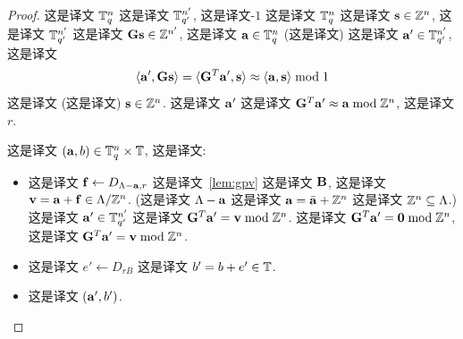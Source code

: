 \begin{proof}
  这是译文 $\mathbb{T}_{q}^{n}$ 这是译文  $\mathbb{T}_{q'}^{n'}$, 这是译文-$1$ 这是译文 $\mathbb{T}_{q}^{n}$ 这是译文 $\mathbf{s} \in \mathbb{Z}^{n}$, 这是译文 $\mathbb{T}_{q'}^{n'}$ 这是译文 $\mathbf{G} \mathbf{s} \in \mathbb{Z}^{n'}$, 这是译文 $\mathbf{a} \in \mathbb{T}_{q}^{n}$ (这是译文) 这是译文 $\mathbf{a}' \in
  \mathbb{T}_{q'}^{n'}$, 这是译文  \[ \langle\mathbf{a}', \mathbf{G} \mathbf{s}\rangle = \langle\mathbf{G}^{T} \mathbf{a}', \mathbf{s}\rangle
  \approx \langle\mathbf{a},\mathbf{s}\rangle \bmod 1 \] 这是译文 (这是译文) $\mathbf{s} \in
  \mathbb{Z}^{n}$.  这是译文 $\mathbf{a}'$ 这是译文  $\mathbf{G}^{T} \mathbf{a}' \approx \mathbf{a} \bmod \mathbb{Z}^{n}$, 这是译文 $r$.
  

  
  这是译文 $(\mathbf{a}, b) \in \mathbb{T}_{q}^{n} \times \mathbb{T}$, 这是译文:
  \begin{itemize}
  \item 这是译文 $\mathbf{f} \gets D_{\Lambda-\mathbf{a},r}$ 这是译文~\ref{lem:gpv} 这是译文  $\mathbf{B}$, 这是译文 $\mathbf{v} = \mathbf{a} + \mathbf{f} \in
    \Lambda/\mathbb{Z}^{n}$. (这是译文 $\Lambda-\mathbf{a}$ 这是译文 $\mathbf{a} =
      \bar{\mathbf{a}}+\mathbb{Z}^{n}$ 这是译文 $\mathbb{Z}^{n} \subseteq \Lambda$.) 这是译文 $\mathbf{a}' \in \mathbb{T}_{q'}^{n'}$ 这是译文  $\mathbf{G}^{T} \mathbf{a}' = \mathbf{v} \bmod \mathbb{Z}^{n}$. 这是译文 $\mathbf{G}^{T}
      \mathbf{a}' = \mathbf{0} \bmod \mathbb{Z}^{n}$, 这是译文  $\mathbf{G}^{T} \mathbf{a}' = \mathbf{v} \bmod \mathbb{Z}^{n}$.
  \item 这是译文 $e' \gets D_{rB}$ 这是译文 $b' = b + e' \in \mathbb{T}$.  
  \item 这是译文 $(\mathbf{a}',b')$.
  \end{itemize}


\end{proof}

